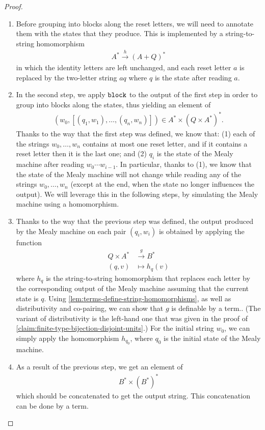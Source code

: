 \begin{proof}
    \begin{enumerate}
        \item Before grouping into blocks along the reset letters, we will need to annotate them with the states that they produce. This is implemented by a string-to-string homomorphism  
        \begin{align*}
        A^* \xrightarrow h (A+Q)^*
        \end{align*}
        in which the identity letters are left unchanged, and each  reset letter $a$ is replaced by the two-letter string $aq$ where $q$  is the state  after reading $a$.  
        \item In the second step, we apply $\mathtt{block}$ to  the output of the first step in order to group into blocks along the states, thus yielding an element of
        \begin{align*}
         (w_0, [(q_1,w_1),\ldots,(q_n,w_n)]) \in  A^* \times (Q \times A^*)^*.
        \end{align*}
        Thanks to the way that the first step was defined, we know that: (1) each of the strings $w_0,\ldots,w_n$ contains at most one reset letter, and if it contains a reset letter then it is the last one; and  (2)  $q_i$ is the state of the Mealy machine after reading $w_0 \cdots w_{i-1}$. In particular, thanks to (1), we know that the state of the Mealy machine will not change while reading any of the strings $w_0,\ldots,w_n$ (except at the end, when the state no longer influences the output). We will leverage this in the following steps, by simulating the Mealy machine using a homomorphism. 
        \item Thanks to the way that the previous step was defined, the output produced by the Mealy machine on each pair $(q_i,w_i)$ is obtained by applying the function 
        \begin{align*}
                Q \times A^* & \xrightarrow g B^*\\ 
                (q,v) & \mapsto h_q(v)
        \end{align*}
        where $h_q$ is the string-to-string homomorphism that replaces each letter by the corresponding output of the Mealy machine assuming that the current state is $q$.  Using \cref{lem:terms-define-string-homomorphisms}, as well as distributivity and co-pairing, we can show that $g$ is definable by a term.. (The variant of distributivity is the left-hand one that was given in the proof of \cref{claim:finite-type-bijection-disjoint-units}.)  For the initial string $w_0$, we can simply apply the homomorphism $h_{q_0}$, where $q_0$ is the initial state of the Mealy machine.
        \item As a result of the previous step, we get an element of 
            \begin{align*}
            B^* \times (B^*)^*
            \end{align*}
            which should be concatenated to get the output string. This concatenation can be done by a term. 
    \end{enumerate}
\end{proof}

